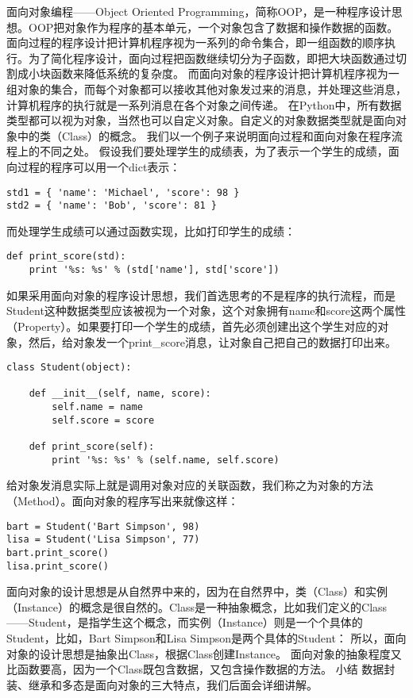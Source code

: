 \documentclass[twoside,11pt]{book}
\begin{document}
面向对象编程——Object Oriented Programming，简称OOP，是一种程序设计思想。OOP把对象作为程序的基本单元，一个对象包含了数据和操作数据的函数。
面向过程的程序设计把计算机程序视为一系列的命令集合，即一组函数的顺序执行。为了简化程序设计，面向过程把函数继续切分为子函数，即把大块函数通过切割成小块函数来降低系统的复杂度。
而面向对象的程序设计把计算机程序视为一组对象的集合，而每个对象都可以接收其他对象发过来的消息，并处理这些消息，计算机程序的执行就是一系列消息在各个对象之间传递。
在Python中，所有数据类型都可以视为对象，当然也可以自定义对象。自定义的对象数据类型就是面向对象中的类（Class）的概念。
我们以一个例子来说明面向过程和面向对象在程序流程上的不同之处。
假设我们要处理学生的成绩表，为了表示一个学生的成绩，面向过程的程序可以用一个dict表示：

\begin{lstlisting}
std1 = { 'name': 'Michael', 'score': 98 }
std2 = { 'name': 'Bob', 'score': 81 }
\end{lstlisting}

而处理学生成绩可以通过函数实现，比如打印学生的成绩：
\begin{lstlisting}
def print_score(std):
    print '%s: %s' % (std['name'], std['score'])
\end{lstlisting}

如果采用面向对象的程序设计思想，我们首选思考的不是程序的执行流程，而是Student这种数据类型应该被视为一个对象，这个对象拥有name和score这两个属性（Property）。如果要打印一个学生的成绩，首先必须创建出这个学生对应的对象，然后，给对象发一个print\_score消息，让对象自己把自己的数据打印出来。
\begin{lstlisting}
class Student(object):

    def __init__(self, name, score):
        self.name = name
        self.score = score

    def print_score(self):
        print '%s: %s' % (self.name, self.score)
\end{lstlisting}

给对象发消息实际上就是调用对象对应的关联函数，我们称之为对象的方法（Method）。面向对象的程序写出来就像这样：
\begin{lstlisting}
bart = Student('Bart Simpson', 98)
lisa = Student('Lisa Simpson', 77)
bart.print_score()
lisa.print_score()
\end{lstlisting}

面向对象的设计思想是从自然界中来的，因为在自然界中，类（Class）和实例（Instance）的概念是很自然的。Class是一种抽象概念，比如我们定义的Class——Student，是指学生这个概念，而实例（Instance）则是一个个具体的Student，比如，Bart Simpson和Lisa Simpson是两个具体的Student：
所以，面向对象的设计思想是抽象出Class，根据Class创建Instance。
面向对象的抽象程度又比函数要高，因为一个Class既包含数据，又包含操作数据的方法。
小结
数据封装、继承和多态是面向对象的三大特点，我们后面会详细讲解。
\end{document}
